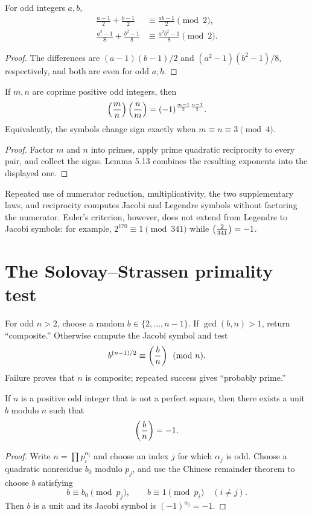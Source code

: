 \begin{lem}
For odd integers $a,b$,
\begin{align*}
 \frac{a-1}{2}+\frac{b-1}{2}
 &\equiv\frac{ab-1}{2}\pmod2,\\
 \frac{a^2-1}{8}+\frac{b^2-1}{8}
 &\equiv\frac{a^2b^2-1}{8}\pmod2.
\end{align*}
\end{lem}
\begin{proof}
The differences are $(a-1)(b-1)/2$ and
$(a^2-1)(b^2-1)/8$, respectively, and both are even for odd $a,b$.
\end{proof}

\begin{thm}
If $m,n$ are coprime positive odd integers, then
\[
 \left(\frac{m}{n}\right)\left(\frac{n}{m}\right)
 =(-1)^{\frac{m-1}{2}\frac{n-1}{2}}.
\]
Equivalently, the symbols change sign exactly when $m\equiv n\equiv3\pmod4$.
\end{thm}
\begin{proof}
Factor $m$ and $n$ into primes, apply prime quadratic reciprocity to every pair, and collect the signs.  Lemma 5.13 combines the resulting exponents into the displayed one.
\end{proof}

\begin{remark}
Repeated use of numerator reduction, multiplicativity, the two supplementary laws, and reciprocity computes Jacobi and Legendre symbols without factoring the numerator.  Euler's criterion, however, does not extend from Legendre to Jacobi symbols: for example,
$2^{170}\equiv1\pmod{341}$ while $\left(\frac{2}{341}\right)=-1$.
\end{remark}

\section{The Solovay--Strassen primality test}

\begin{app}
For odd $n>2$, choose a random $b\in\{2,\ldots,n-1\}$.  If
$\gcd(b,n)>1$, return ``composite.''  Otherwise compute the Jacobi symbol and test
\[
 b^{(n-1)/2}\equiv\left(\frac{b}{n}\right)\pmod n.
\]
Failure proves that $n$ is composite; repeated success gives ``probably prime.''
\end{app}

\begin{lem}
If $n$ is a positive odd integer that is not a perfect square, then there exists a unit $b$ modulo $n$ such that
\[
 \left(\frac{b}{n}\right)=-1.
\]
\end{lem}
\begin{proof}
Write $n=\prod p_i^{\alpha_i}$ and choose an index $j$ for which $\alpha_j$ is odd.  Choose a quadratic nonresidue $b_0$ modulo $p_j$, and use the Chinese remainder theorem to choose $b$ satisfying
\[
 b\equiv b_0\pmod{p_j},
 \qquad
 b\equiv1\pmod{p_i}\quad(i\ne j).
\]
Then $b$ is a unit and its Jacobi symbol is $(-1)^{\alpha_j}=-1$.
\end{proof}


